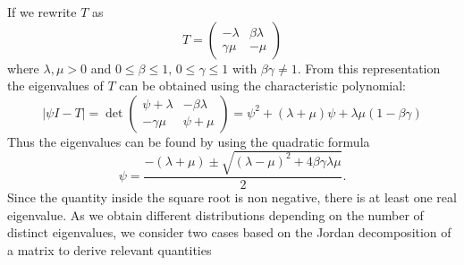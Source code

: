 \documentclass[11pt]{article}
\begin{document}
If we rewrite $T$ as
\begin{equation}
\label{mtx.T}
T=\begin{pmatrix}
  -\lambda    & \beta \lambda   \\
     \gamma \mu & -\mu 
\end{pmatrix}
\end{equation} where $\lambda, \mu>0$ and $0 \le \beta  \le 1, \, 0\le \gamma \le 1$ with $\beta \gamma \ne 1$. From this representation the eigenvalues of $T$  can be obtained using the characteristic polynomial:
\begin{equation}
\label{ }
|\psi I-T|=\det \begin{pmatrix}
 \psi +\lambda    & -\beta \lambda   \\
     -\gamma \mu & \psi+\mu 
\end{pmatrix}= \psi^2+(\lambda+\mu)\psi+\lambda \mu (1-\beta \gamma)
\end{equation}
Thus the eigenvalues can be found by using the quadratic formula
\begin{equation}
\label{eigen.val.form}
\psi=\frac{-(\lambda+\mu)\pm \sqrt{(\lambda-\mu)^2+4\beta  \gamma \lambda \mu}}{2}.
\end{equation}
Since the quantity inside the square root is non negative, there is at least one real eigenvalue. As we obtain different distributions depending on the number of distinct eigenvalues, we consider two cases based on the Jordan decomposition of a matrix to derive relevant quantities
\end{document}
